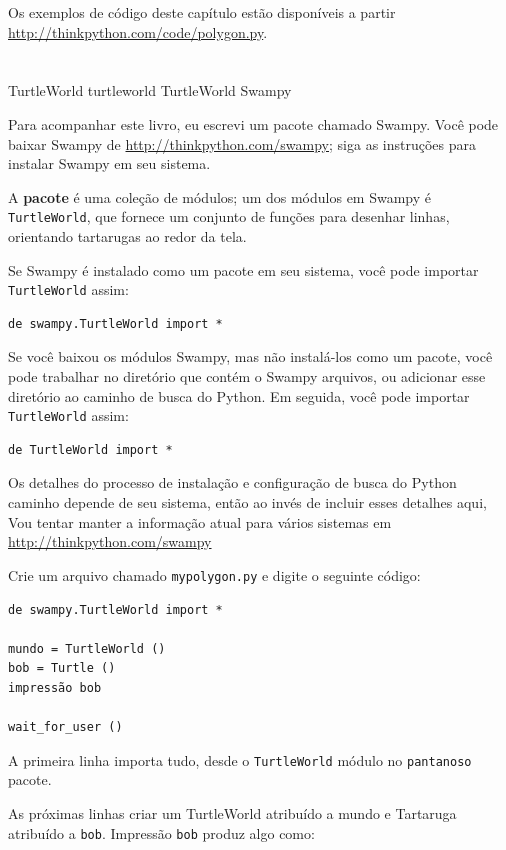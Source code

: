 \documentclass[10pt]{book}
\begin{document}
\begin{exercise}
Os exemplos de código deste capítulo estão disponíveis a partir
\url{http://thinkpython.com/code/polygon.py}.


\section{} TurtleWorld
\label{} turtleworld
\index{} TurtleWorld
\index{} Swampy

Para acompanhar este livro, eu escrevi um pacote chamado Swampy.
Você pode baixar Swampy de \url{http://thinkpython.com/swampy};
siga as instruções para instalar Swampy em seu sistema.

A {\bf pacote} é uma coleção de módulos; um dos módulos em
Swampy é {\tt TurtleWorld}, que fornece um conjunto de funções para
desenhar linhas, orientando tartarugas ao redor da tela.

Se Swampy é instalado como um pacote em seu sistema, você pode importar
{\tt TurtleWorld} assim:

\begin{verbatim}
de swampy.TurtleWorld import *
\end{verbatim}

Se você baixou os módulos Swampy, mas não instalá-los como um
pacote, você pode trabalhar no diretório que contém o Swampy
arquivos, ou adicionar esse diretório ao caminho de busca do Python. Em seguida, você pode importar
{\tt TurtleWorld} assim:

\begin{verbatim}
de TurtleWorld import *
\end{verbatim}

Os detalhes do processo de instalação e configuração de busca do Python
caminho depende de seu sistema, então ao invés de incluir esses detalhes aqui,
Vou tentar manter a informação atual para vários sistemas
em \url{http://thinkpython.com/swampy}

Crie um arquivo chamado {\tt mypolygon.py} e digite o seguinte
código:

\begin{verbatim}
de swampy.TurtleWorld import *

mundo = TurtleWorld ()
bob = Turtle ()
impressão bob

wait_for_user ()
\end{verbatim}
%
A primeira linha importa tudo, desde o {\tt TurtleWorld} módulo
no {\tt pantanoso} pacote.

As próximas linhas criar um TurtleWorld atribuído a {mundo \tt} e
Tartaruga atribuído a {\tt bob}. Impressão {\tt bob} produz algo
como:


\end{exercise}
\end{document}
